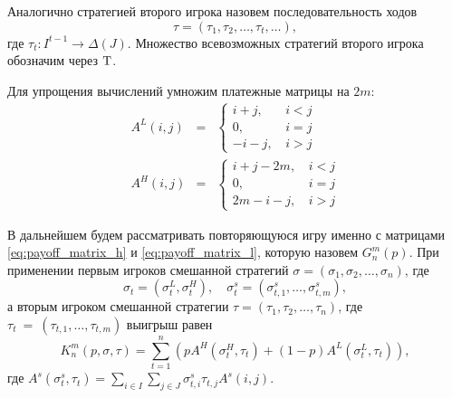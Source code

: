 Аналогично стратегией второго игрока назовем последовательность ходов
\[
  \tau = (\tau_1, \tau_2, \ldots, \tau_t, \ldots),
\]
где $ \tau_t: I^{t-1} \rightarrow \Delta(J) $. Множество всевозможных стратегий второго игрока обозначим через $ \mathrm{T} $.

Для упрощения вычислений умножим платежные матрицы на $ 2m $:
\begin{eqnarray}
\label{eq:payoff_matrix_h}
A^L(i, j) &=& \begin{cases}
  i + j, &\, i < j\\
  0, &\, i = j\\
  -i - j, &\, i > j
\end{cases}
\\
\label{eq:payoff_matrix_l}
A^H(i, j) &=& \begin{cases}
  i + j - 2m, &\, i < j\\
  0, &\, i = j\\
  2m - i - j, &\, i > j
\end{cases}
\end{eqnarray}

В дальнейшем будем рассматривать повторяющуюся игру именно с матрицами \eqref{eq:payoff_matrix_h} и \eqref{eq:payoff_matrix_l}, которую назовем $ G_n^m(p) $. При применении первым игроков смешанной стратегий 
$ \sigma = (\sigma_1, \sigma_2, \ldots, \sigma_n) $, где 
\[ 
  \sigma_t = (\sigma_t^L, \sigma_t^H), \quad
  \sigma^s_t = (\sigma^s_{t, 1}, \ldots, \sigma^s_{t, m}),
\] 
а вторым игроком смешанной стратегии 
$ \tau = (\tau_1, \tau_2, \ldots, \tau_n) $, где
$ \tau_t~=~(\tau_{t, 1}, \ldots, \tau_{t, m}) $
выигрыш равен
\begin{equation}
\label{eq:value_of_game_n}
K_n^m(p, \sigma, \tau) = \sum_{t=1}^n
    \left(
        pA^H(\sigma_t^H, \tau_t) + (1 - p)A^L(\sigma_t^L, \tau_t)
    \right),
\end{equation}
где 
$ 
  A^s(\sigma^s_t,\tau_t) = 
    \sum_{i \in I}
      \sum_{j \in J}
        \sigma^s_{t, i} \tau_{t, j} A^s(i, j).
$